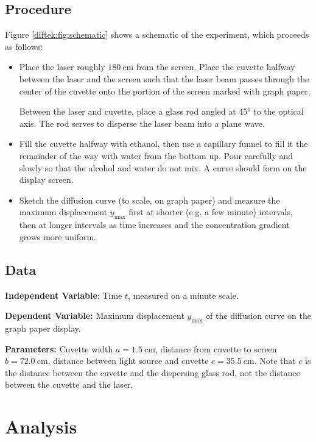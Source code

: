 \documentclass[11pt, a4paper]{article}
\begin{document}
\subsection{Procedure}
Figure \ref{diftek:fig:schematic} shows a schematic of the experiment, which proceeds as follows:
\begin{itemize}
	\item Place the laser roughly $ \SI{180}{\centi \meter} $ from the screen. Place the cuvette halfway between the laser and the screen such that the laser beam passes through the center of the cuvette onto the portion of the screen marked with graph paper.
	
	Between the laser and cuvette, place a glass rod angled at \ang{45} to the optical axis. The rod serves to disperse the laser beam into a plane wave. 
	
	\item Fill the cuvette halfway with ethanol, then use a capillary funnel to fill it the remainder of the way with water from the bottom up. Pour carefully and slowly so that the alcohol and water do not mix. A curve should form on the display screen.
	
	\item Sketch the diffusion curve (to scale, on graph paper) and measure the maximum displacement $ y_{\text{max}} $ first at shorter (e.g. a few minute) intervals, then at longer intervals as time increases and the concentration gradient grows more uniform. 
	
\end{itemize}

\subsection{Data}
\textbf{Independent Variable}: Time $ t $, measured on a minute scale.

\vspace{2mm}
\textbf{Dependent Variable:} Maximum displacement $ y_{\text{max}} $ of the diffusion curve on the graph paper display.

\vspace{2mm}
\textbf{Parameters:} Cuvette width $ a = \SI{1.5}{\centi \meter} $, distance from cuvette to screen $ b =  \SI{72.0}{\centi \meter} $, distance between light source and cuvette $ c =  \SI{35.5}{\centi \meter} $. Note that $ c $ is the distance between the cuvette and the dispersing glass rod, not the distance between the cuvette and the laser.


\section{Analysis}
\end{document}

